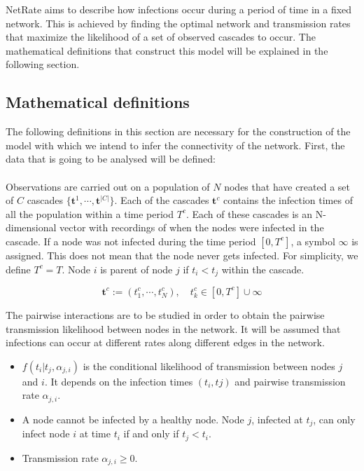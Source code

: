 NetRate aims to describe how infections occur during a period of time in a fixed network. This is achieved by finding the optimal network and transmission rates that maximize the likelihood of a set of observed cascades to occur. The mathematical definitions that construct this model will be explained in the following section.


\subsection{Mathematical definitions}

The following definitions in this section are necessary for the construction of the model with which we intend to infer the connectivity of the network. First, the data that is going to be analysed will be defined:
\\\\
Observations are carried out on a population of $N$ nodes that have created a set of $C$ cascades $\{\textbf{t}^{1},\cdots,\textbf{t}^{|C|}\}$. Each of the cascades $\textbf{t}^{c}$ contains the infection times of all the population within a time period $T^{c}$. Each of these cascades is an N-dimensional vector with recordings of when the nodes were infected in the cascade. If a node was not infected during the time period $[0,T^{c}]$, a symbol $\infty$ is assigned. This does not mean that the node never gets infected. For simplicity, we define $T^{c}=T$. Node $i$ is parent of node $j$ if $t_{i}<t_{j}$ within the cascade.


\begin{equation}\label{eq:data_netrate}
\textbf{t}^{c}:=(t_{1}^{c},\cdots,t_{N}^{c}),\quad t_{k}^{c}\in [0,T^{c}]\cup{\infty}
\end{equation}

The pairwise interactions are to be studied in order to obtain the pairwise transmission likelihood between nodes in the network. It will be assumed that infections can occur at different rates along different edges in the network. 

\begin{itemize}
\item $f(t_{i}|t_{j},\alpha _{j,i})$ is the conditional likelihood of transmission between nodes $j$ and $i$. It depends on the infection times $(t_{i},t{j})$ and pairwise transmission rate $\alpha_{j,i}$.
\item A node cannot be infected by a healthy node. Node $j$, infected at $t_{j}$, can only infect node $i$ at time $t_{i}$ if and only if $t_{j}<t_{i}$.
\item Transmission rate $\alpha _{j,i}\geq0$.
\end{itemize}

